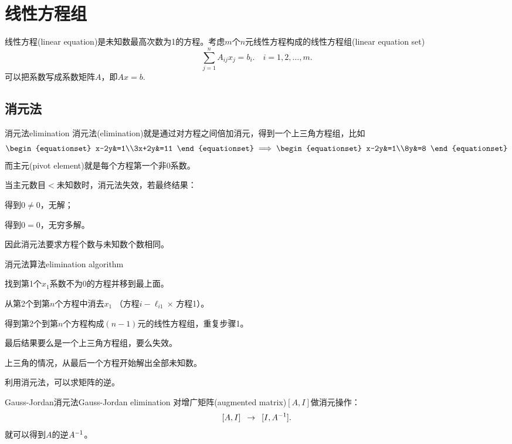 \chapter{线性方程组}

线性方程(linear equation)是未知数最高次数为1的方程。考虑$m$个$n$元线性方程构成的线性方程组(linear equation set)
\[
	\sum_{j=1}^nA_{ij}x_j=b_i.\quad i=1,2,\ldots,m.
\]
可以把系数写成系数矩阵$A$，即$Ax=b.$
\section{消元法}
\begin{definition}{消元法}{elimination}
	消元法(elimination)就是通过对方程之间倍加消元，得到一个上三角方程组，比如
	\[
		\begin{equationset}
			x-2y&=1\\3x+2y&=11
		\end{equationset}\implies
		\begin{equationset}
			x-2y&=1\\8y&=8
		\end{equationset}
	\]
	而主元(pivot element)就是每个方程第一个非0系数。
\end{definition}

当主元数目$<$未知数时，消元法失效，若最终结果：
\begin{compactitem}
	\item 得到$0\neq 0$，无解；
	\item 得到$0=0$，无穷多解。
\end{compactitem}
因此消元法要求方程个数与未知数个数相同。

\begin{method}{消元法算法}{elimination algorithm}
	\begin{compactenum}
		\item 找到第1个$x_1$系数不为0的方程并移到最上面。%
		\item 从第2个到第$n$个方程中消去$x_1$ （方程$i-\ell_{i1}\times$\!\,方程1）。
		\item 得到第2个到第$n$个方程构成$(n-1)$元的线性方程组，重复步骤1。
		\item 最后结果要么是一个上三角方程组，要么失效。
		\item 上三角的情况，从最后一个方程开始解出全部未知数。
	\end{compactenum}
\end{method}

利用消元法，可以求矩阵的逆。
\begin{method}{Gauss-Jordan消元法}{Gauss-Jordan elimination}
	对增广矩阵(augmented matrix)\;$[A,I]$做消元操作：
	\[
		[A,I]\enspace\to\enspace[I,A^{-1}].
	\]
	就可以得到$A$的逆$A^{-1}$。
\end{method}
